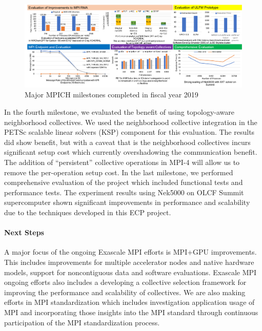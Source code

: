 \begin{figure}[htb]
  \centering
  \includegraphics[width=6in]{projects/2.3.1-PMR/2.3.1.07-Exascale-MPI/MPICH-recent-milestones.pdf}
  \caption{\label{fig:fy19}Major MPICH milestones completed in fiscal year 2019}
\end{figure}

In the fourth milestone, we evaluated the benefit of using
topology-aware neighborhood collectives. We used the neighborhood
collective integration in the PETSc scalable linear solvers (KSP)
component for this evaluation. The results did show benefit, but with a
caveat that is the neighborhood collectives incurs significant setup
cost which currently overshadowing the communication benefit. The
addition of ``persistent'' collective operations in MPI-4 will allow us
to remove the per-operation setup cost. In the last milestone, we
performed comprehensive evaluation of the project which included
functional tests and performance tests.  The experiment results using
Nek5000 on OLCF Summit supercomputer shown significant improvements in
performance and scalability due to the techniques developed in this ECP
project.

\paragraph{Next Steps}
A major focus of the ongoing Exascale MPI efforts is MPI+GPU
improvements. This includes improvements for
multiple accelerator nodes and native hardware models, support for
noncontiguous data and software evaluations. Exascale MPI ongoing
efforts also includes a developing a collective selection framework for
improving the performance and scalability of collectives. We are also
making efforts in MPI standardization which includes investigation
application usage of MPI and incorporating those insights into the
MPI standard through continuous participation of the MPI standardization
process.

